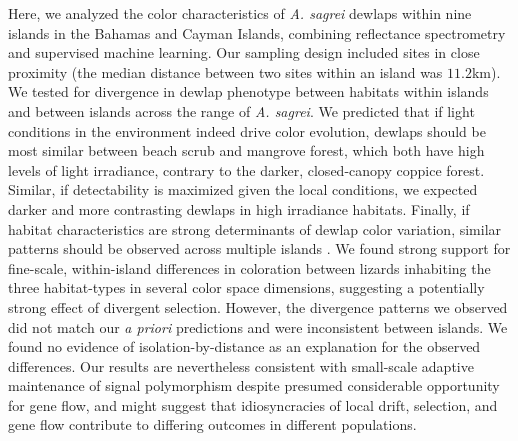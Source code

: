 Here, we analyzed the color characteristics of \textit{A. sagrei} dewlaps within nine islands in the Bahamas and Cayman Islands, combining reflectance spectrometry and supervised machine learning. Our sampling design included sites in close proximity (the median distance between two sites within an island was $11.2$km). We tested for divergence in dewlap phenotype between habitats within islands and between islands across the range of \textit{A. sagrei}. We predicted that if light conditions in the environment indeed drive color evolution, dewlaps should be most similar between beach scrub and mangrove forest, which both have high levels of light irradiance, contrary to the darker, closed-canopy coppice forest. Similar, if detectability is maximized given the local conditions, we expected darker and more contrasting dewlaps in high irradiance habitats. Finally, if habitat characteristics are strong determinants of dewlap color variation, similar patterns should be observed across multiple islands \citep{Losos2011}. We found strong support for fine-scale, within-island differences in coloration between lizards inhabiting the three habitat-types in several color space dimensions, suggesting a potentially strong effect of divergent selection. However, the divergence patterns we observed did not match our \textit{a priori} predictions and were inconsistent between islands. We found no evidence of isolation-by-distance as an explanation for the observed differences. Our results are nevertheless consistent with small-scale adaptive maintenance of signal polymorphism despite presumed considerable opportunity for gene flow, and might suggest that idiosyncracies of local drift, selection, and gene flow contribute to differing outcomes in different populations.




